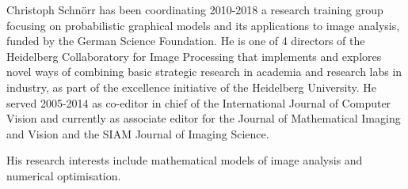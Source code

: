 Christoph Schn\"{o}rr has been coordinating 2010-2018 a research training group focusing on probabilistic graphical models and its applications to image analysis, funded by the German Science Foundation. He is one of 4 directors of the Heidelberg Collaboratory for Image Processing that implements and explores novel ways of combining basic strategic research in academia and research labs in industry, as part of the excellence initiative of the Heidelberg University. He served 2005-2014 as co-editor in chief of the International Journal of Computer Vision and currently as associate editor for the Journal of Mathematical Imaging and Vision and the SIAM Journal of Imaging Science.

His research interests include mathematical models of image analysis and numerical optimisation.



